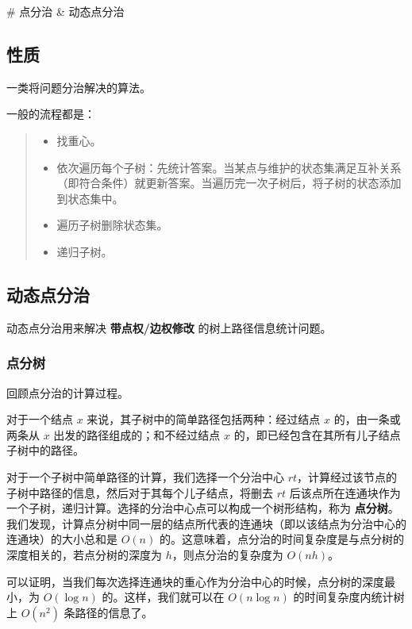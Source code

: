 \documentclass[
]{article}
\author{}
\date{}
\begin{document}
\# 点分治 \& 动态点分治

\hypertarget{ux6027ux8d28}{%
\subsection{性质}\label{ux6027ux8d28}}

一类将问题分治解决的算法。

一般的流程都是：

\begin{quote}
\begin{itemize}
\item
  找重心。
\item
  依次遍历每个子树：先统计答案。当某点与维护的状态集满足互补关系（即符合条件）就更新答案。当遍历完一次子树后，将子树的状态添加到状态集中。
\item
  遍历子树删除状态集。
\item
  递归子树。
\end{itemize}
\end{quote}

\hypertarget{ux52a8ux6001ux70b9ux5206ux6cbb}{%
\subsection{动态点分治}\label{ux52a8ux6001ux70b9ux5206ux6cbb}}

动态点分治用来解决 \textbf{带点权/边权修改} 的树上路径信息统计问题。

\hypertarget{ux70b9ux5206ux6811}{%
\subsubsection{点分树}\label{ux70b9ux5206ux6811}}

回顾点分治的计算过程。

对于一个结点 \(x\) 来说，其子树中的简单路径包括两种：经过结点 \(x\)
的，由一条或两条从 \(x\) 出发的路径组成的；和不经过结点 \(x\)
的，即已经包含在其所有儿子结点子树中的路径。

对于一个子树中简单路径的计算，我们选择一个分治中心
\(rt\)，计算经过该节点的子树中路径的信息，然后对于其每个儿子结点，将删去
\(rt\)
后该点所在连通块作为一个子树，递归计算。选择的分治中心点可以构成一个树形结构，称为
\textbf{点分树}。我们发现，计算点分树中同一层的结点所代表的连通块（即以该结点为分治中心的连通块）的大小总和是
\(O(n)\)
的。这意味着，点分治的时间复杂度是与点分树的深度相关的，若点分树的深度为
\(h\)，则点分治的复杂度为 \(O(nh)\)。

可以证明，当我们每次选择连通块的重心作为分治中心的时候，点分树的深度最小，为
\(O(\log n)\) 的。这样，我们就可以在 \(O(n\log n)\)
的时间复杂度内统计树上 \(O(n^2)\) 条路径的信息了。
\end{document}
